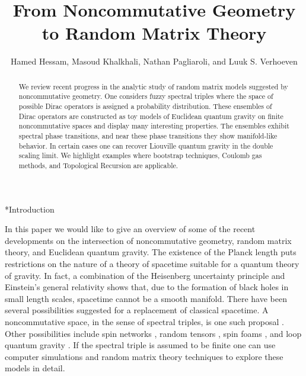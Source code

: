 \documentclass[10pt]{article}
\date{}
\title{From Noncommutative Geometry to Random Matrix Theory}
\author{Hamed Hessam, Masoud Khalkhali, Nathan Pagliaroli, and Luuk S. Verhoeven}
\affil{Department of Mathematics, Western University\\
	London, Ontario, Canada\footnote{\emph{Email addresses}: hhessam@uwo.ca, masoud@uwo.ca, npagliar@uwo.ca, lverhoe@uwo.ca}}
\makeatletter
\def\section{\@startsection{section}{1}{\z@}{-3.25ex plus -1ex minus
		-.2ex}{1.5ex plus .2ex}{\normalfont\bfseries}}
\makeatother
\begin{document}
	\maketitle
	\begin{abstract}
 We review recent progress in the analytic study of random matrix models suggested by noncommutative geometry. One considers fuzzy spectral triples where the space of possible Dirac operators is assigned a probability distribution. These ensembles of Dirac operators are constructed as toy models of Euclidean quantum gravity on finite noncommutative spaces and display many interesting properties. The ensembles exhibit spectral phase transitions, and near these phase transitions they show manifold-like behavior. In certain cases one can recover Liouville quantum gravity in the double scaling limit.  We highlight examples where bootstrap techniques, Coulomb gas methods, and Topological Recursion are applicable. 
	\end{abstract}


\tableofcontents


\section*{Introduction}

In this paper we would like to give an overview of some of the recent developments on the intersection of noncommutative geometry, random matrix theory, and Euclidean quantum gravity. The existence of the Planck length puts restrictions on the nature of a theory of spacetime suitable for a quantum theory of gravity. In fact,  a combination of the Heisenberg uncertainty principle  and Einstein's general relativity shows that, due to the formation of black holes in small length scales, spacetime cannot be a smooth manifold. There have been several possibilities suggested  for a replacement of classical spacetime. A noncommutative space, in the sense of spectral triples, is one such proposal \cite{Connes-Hilbert}. Other possibilities include spin networks \cite{spin networks}, random tensors \cite{random tensors}, spin foams \cite{spin foam}, and loop quantum gravity \cite{loop quantum gravity}.  If the spectral triple is assumed to be finite one can use computer simulations and random matrix theory techniques to explore these models in detail.
\end{document}
